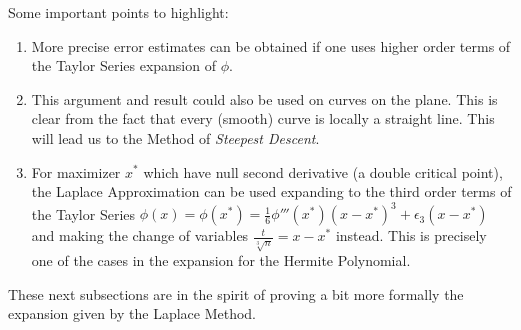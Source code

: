Some important points to highlight:
\begin{enumerate}
	\item More precise error estimates can be obtained if one uses higher order terms of the Taylor Series expansion of $\phi$.
	\item This argument and result could also be used on curves on the plane. This is clear from the fact that every (smooth) curve is locally a straight line. This will lead us to the Method of \textit{Steepest Descent}.
	\item For maximizer $x^*$ which have null second derivative (a double critical point), the Laplace Approximation can be used expanding to the third order terms of the Taylor Series $\phi(x) = \phi(x^*) = \frac{1}{6}\phi'''(x^*)(x-x^*)^3 + \epsilon_3(x-x^*)$ and making the change of variables $\frac{t}{\sqrt[3]{n}} = x - x^*$ instead. This is precisely one of the cases in the expansion for the Hermite Polynomial. 
\end{enumerate}

These next subsections are in the spirit of proving a bit more formally the expansion given by the Laplace Method. 



